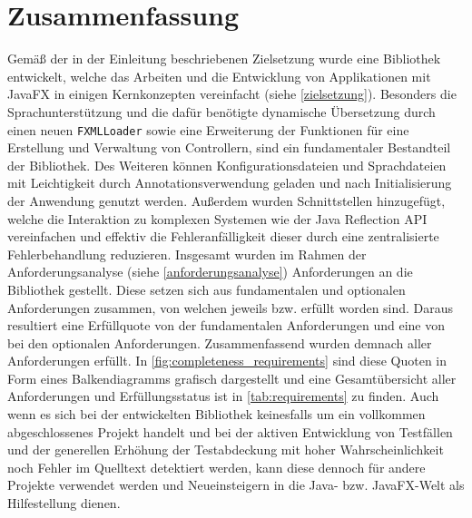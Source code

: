\section{Zusammenfassung}
\label{zusammenfassung}
Gemäß der in der Einleitung beschriebenen Zielsetzung wurde eine Bibliothek entwickelt, welche das Arbeiten und die Entwicklung von Applikationen mit JavaFX in einigen Kernkonzepten vereinfacht (siehe \autoref{zielsetzung}). Besonders die Sprachunterstützung und die dafür benötigte dynamische Übersetzung durch einen neuen \texttt{FXMLLoader} sowie eine Erweiterung der Funktionen für eine Erstellung und Verwaltung von Controllern, sind ein fundamentaler Bestandteil der Bibliothek. Des Weiteren können Konfigurationsdateien und Sprachdateien mit Leichtigkeit durch Annotationsverwendung geladen und nach Initialisierung der Anwendung genutzt werden. Außerdem wurden Schnittstellen hinzugefügt, welche die Interaktion zu komplexen Systemen wie der Java Reflection API vereinfachen und effektiv die Fehleranfälligkeit dieser durch eine zentralisierte Fehlerbehandlung reduzieren. Insgesamt wurden im Rahmen der Anforderungsanalyse (siehe \autoref{anforderungsanalyse}) \thereq{} Anforderungen an die Bibliothek gestellt. Diese setzen sich aus \thereqFunAmount{} fundamentalen und \thereqOptAmount{} optionalen Anforderungen zusammen, von welchen jeweils \thereqFunCompleted{} bzw. \thereqOptCompleted{} erfüllt worden sind. Daraus resultiert eine Erfüllquote von \CalculatePercentage{\thereqFunCompleted}{\thereqFunAmount} der fundamentalen Anforderungen und eine von \CalculatePercentage{\thereqOptCompleted}{\thereqOptAmount} bei den optionalen Anforderungen. Zusammenfassend wurden demnach \CalculatePercentage{\thereqTotalCompleted}{\thereq} aller Anforderungen erfüllt. In \autoref{fig:completeness_requirements} sind diese Quoten in Form eines Balkendiagramms grafisch dargestellt und eine Gesamtübersicht aller Anforderungen und Erfüllungsstatus ist in \autoref{tab:requirements} zu finden. Auch wenn es sich bei der entwickelten Bibliothek keinesfalls um ein vollkommen abgeschlossenes Projekt handelt und bei der aktiven Entwicklung von Testfällen und der generellen Erhöhung der Testabdeckung mit hoher Wahrscheinlichkeit noch Fehler im Quelltext detektiert werden, kann diese dennoch für andere Projekte verwendet werden und Neueinsteigern in die Java- bzw. JavaFX-Welt als Hilfestellung dienen.
